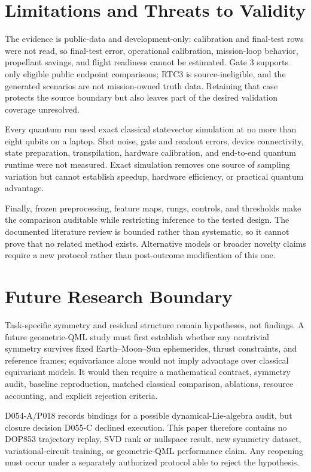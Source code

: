 \section{Limitations and Threats to Validity}
\label{sec:limitations}

The evidence is public-data and development-only: calibration and final-test
rows were not read, so final-test error, operational calibration, mission-loop
behavior, propellant savings, and flight readiness cannot be estimated. Gate 3
supports only eligible public endpoint comparisons; RTC3 is source-ineligible,
and the generated scenarios are not mission-owned truth data. Retaining that
case protects the source boundary but also leaves part of the desired
validation coverage unresolved.

Every quantum run used exact classical statevector simulation at no more than
eight qubits on a laptop. Shot noise, gate and readout errors, device
connectivity, state preparation, transpilation, hardware calibration, and
end-to-end quantum runtime were not measured. Exact simulation removes one
source of sampling variation but cannot establish speedup, hardware efficiency,
or practical quantum advantage.

Finally, frozen preprocessing, feature maps, rungs, controls, and thresholds
make the comparison auditable while restricting inference to the tested
design. The documented literature review is bounded rather than systematic,
so it cannot prove that no related method exists. Alternative models or broader
novelty claims require a new protocol rather than post-outcome modification of
this one.

\section{Future Research Boundary}

Task-specific symmetry and residual structure remain hypotheses, not findings.
A future geometric-QML study must first establish whether any nontrivial
symmetry survives fixed Earth--Moon--Sun ephemerides, thrust constraints, and
reference frames; equivariance alone would not imply advantage over classical
equivariant models. It would then require a mathematical contract, symmetry
audit, baseline reproduction, matched classical comparison, ablations, resource
accounting, and explicit rejection criteria.

D054-A/P018 records bindings for a possible dynamical-Lie-algebra audit, but
closure decision D055-C declined execution. This paper therefore contains no
DOP853 trajectory replay, SVD rank or nullspace result, new symmetry dataset,
variational-circuit training, or geometric-QML performance claim. Any reopening
must occur under a separately authorized protocol able to reject the hypothesis.

